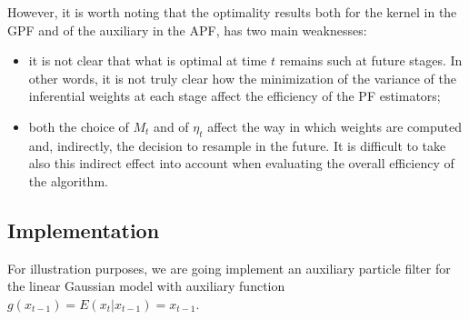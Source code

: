 \documentclass[
]{book}
\theoremstyle{break}
\theoremstyle{nonumberplain}
\begin{document}
However, it is worth noting that the optimality results both for the
kernel in the GPF and of the auxiliary in the APF, has two main
weaknesses:

\begin{itemize}
    \item it is not clear that what is optimal at time $t$ remains such at future stages. In other words, it is not truly clear how the minimization of the variance of the inferential weights at each stage affect the efficiency of the PF estimators;
    \item both the choice of $M_t$ and of $\eta_t$ affect the way in which weights are computed and, indirectly, the decision to resample in the future. It is difficult to take also this indirect effect into account when evaluating the  overall efficiency of the algorithm.
\end{itemize}

\subsection{Implementation}

For illustration purposes, we are going implement an auxiliary particle
filter for the linear Gaussian model with auxiliary function
\(g(x_{t-1})=E(x_{t}|x_{t-1})=x_{t-1}\).
\end{document}
